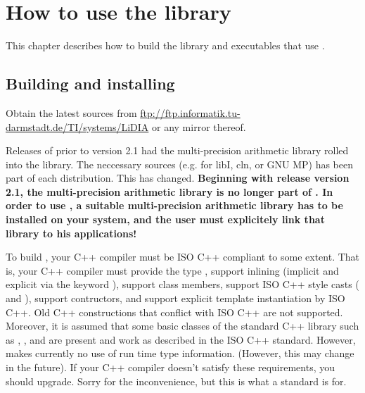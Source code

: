 
\chapter{How to use the \LiDIA library}
This chapter describes how to build the \LiDIA library and executables that
use \LiDIA.


\section{Building and installing \LiDIA}
Obtain the latest sources from
\url{ftp://ftp.informatik.tu-darmstadt.de/TI/systems/LiDIA} or any mirror
thereof.

\attentionIII Releases of \LiDIA prior to version 2.1 had the
multi-precision arithmetic library rolled into the \LiDIA library.  The
neccessary sources (e.g. for libI, cln, or GNU MP) has been part of each
\LiDIA distribution.  This has changed.  \textbf{Beginning with release
version 2.1, the multi-precision arithmetic library is no longer part of
\LiDIA.  In order to use \LiDIA, a suitable multi-precision arithmetic
library has to be installed on your system, and the user must explicitely
link that library to his applications!}

\attentionI To build \LiDIA, your C++ compiler must be ISO C++ compliant to
some extent.  That is, your C++ compiler must provide the type ,
support inlining (implicit and explicit via the keyword ),
support  class members, support ISO C++ style casts
( and ), support
 contructors, and support explicit template instantiation by
ISO C++.  Old C++ constructions that conflict with ISO C++ are not
supported.  Moreover, it is assumed that some basic classes of the standard
C++ library such as , , and  are
present and work as described in the ISO C++ standard.  However, \LiDIA
makes currently no use of run time type information.
(However, this may change in the future).  If your C++ compiler doesn't
satisfy these requirements, you should upgrade.  Sorry for the
inconvenience, but this is what a standard is for.

